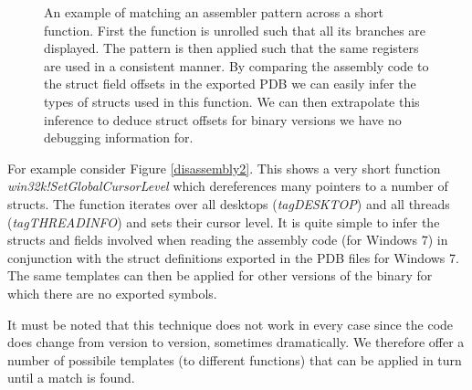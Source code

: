 \begin{figure}[tb]
\caption{An example of matching an assembler pattern across a short
  function. First the function is unrolled such that all its branches are
  displayed. The pattern is then applied such that the same registers are used
  in a consistent manner. By comparing the assembly code to the struct field
  offsets in the exported PDB we can easily infer the types of structs used in
  this function. We can then extrapolate this inference to deduce struct offsets
  for binary versions we have no debugging information for.
}
\end{figure}

For example consider Figure \ref{disassembly2}. This shows a very short function
{\em win32k!SetGlobalCursorLevel} which dereferences many pointers to a number
of structs. The function iterates over all desktops ({\em tagDESKTOP}) and all
threads ({\em tagTHREADINFO}) and sets their cursor level. It is quite simple to
infer the structs and fields involved when reading the assembly code (for
Windows 7) in conjunction with the struct definitions exported in the PDB files
for Windows 7. The same templates can then be applied for other versions of the
binary for which there are no exported symbols.

It must be noted that this technique does not work in every case since the code
does change from version to version, sometimes dramatically. We therefore offer
a number of possibile templates (to different functions) that can be applied in
turn until a match is found.

